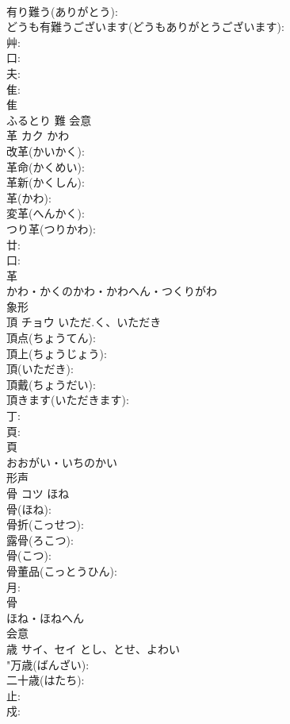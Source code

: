 \documentclass[8pt]{extreport}
\begin{document}
\begin{CJK}{UTF8}{min}
\\	有り難う(ありがとう): 
\\	どうも有難うございます(どうもありがとうございます): 
\\	艸: 
\\	口: 
\\	夫: 
\\	隹: 
\\	隹	
\\	ふるとり	難	会意 
\\	革	カク	かわ		
\\	改革(かいかく): 
\\	革命(かくめい): 
\\	革新(かくしん): 
\\	革(かわ): 
\\	変革(へんかく): 
\\	つり革(つりかわ): 
\\	廿: 
\\	口: 
\\	革	
\\	かわ・かくのかわ・かわへん・つくりがわ	
\\	象形 
\\	頂	チョウ	いただ.く、いただき		
\\	頂点(ちょうてん): 
\\	頂上(ちょうじょう): 
\\	頂(いただき): 
\\	頂戴(ちょうだい): 
\\	頂きます(いただきます): 
\\	丁: 
\\	頁: 
\\	頁	
\\	おおがい・いちのかい	
\\	形声 
\\	骨	コツ	ほね		
\\	骨(ほね): 
\\	骨折(こっせつ): 
\\	露骨(ろこつ): 
\\	骨(こつ): 
\\	骨董品(こっとうひん): 
\\	月: 
\\	骨	
\\	ほね・ほねへん	
\\	会意 
\\	歳	サイ、セイ	とし、とせ、よわい		
\\	"万歳(ばんざい): 
\\	二十歳(はたち): 
\\	止: 
\\	戍: 

\end{CJK}
\end{document}
